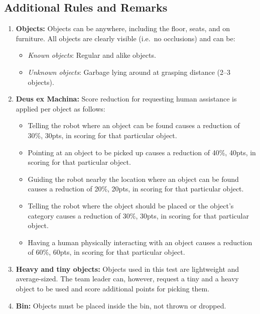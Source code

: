 \subsection*{Additional Rules and Remarks}
\begin{enumerate}[nosep]
	\item \textbf{Objects:}
	Objects can be anywhere, including the floor, seats, and on furniture.
	All objects are clearly visible (i.e.~no occlusions) and can be:
	\begin{itemize}[nosep]
		\item\textit{Known objects}: Regular and alike objects.
		\item\textit{Unknown objects}: Garbage lying around at grasping distance (2--3 objects).
	\end{itemize}

	\item \textbf{Deus ex Machina:} Score reduction for requesting human assistance is applied per object as follows:
	\begin{itemize}[nosep]
		\item Telling the robot where an object can be found causes a reduction of 30\%, 30pts, in scoring for that particular object.

		\item Pointing at an object to be picked up causes a reduction of 40\%, 40pts, in scoring for that particular object.

		\item Guiding the robot nearby the location where an object can be found causes a reduction of 20\%, 20pts, in scoring for that particular object.

		\item Telling the robot where the object should be placed or the object's category causes a reduction of 30\%, 30pts, in scoring for that particular object.

		\item Having a human physically interacting with an object causes a reduction of 60\%, 60pts, in scoring for that particular object.
	\end{itemize}

	\item \textbf{Heavy and tiny objects:} Objects used in this test are lightweight and average-sized.
	The team leader can, however, request a tiny and a heavy object to be used and score additional points for picking them.

	\item \textbf{Bin:} Objects must be placed inside the bin, not thrown or dropped.
\end{enumerate}

